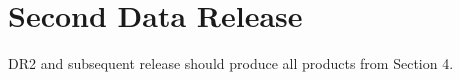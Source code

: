 \section{Second  Data Release } \label{sect:dr2}
DR2 and subsequent release should produce all products from \DPDD Section 4.
